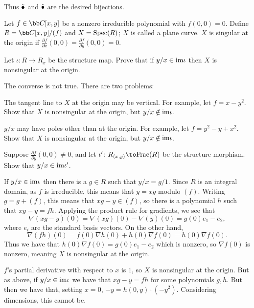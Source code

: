     Thus $\tilde{\bullet}$ and $\hat{\bullet}$ are the desired bijections.
\eenum

\def\pdvof#1#2{\frac{\partial#1}{\partial#2}}

\bprob

    Let $f\in\bC[x,y]$ be a nonzero irreducible polynomial with $f(0,0)=0$.
    Define $R=\bC[x,y]/(f)$ and $X={\rm Spec}(R)$; $X$ is called a {\emphcolor plane curve}.
    $X$ is {\emphcolor singular at the origin} if $\pdvof fx(0,0)=\pdvof fy(0,0)=0$.
    \benum
        \item Let $\iota\colon R\to R_x$ be the structure map.
        Prove that if $y/x\in{\rm im}\iota$ then $X$ is nonsingular at the origin.
        \item The converse is not true.
        There are two problems:
        \benum
            \item The tangent line to $X$ at the origin may be vertical.
            For example, let $f=x-y^2$.
            Show that $X$ is nonsingular at the origin, but $y/x\notin{\rm im}\iota$.
            \item $y/x$ may have poles other than at the origin.
            For example, let $f=y^2-y+x^2$.
            Show that $X$ is nonsingular at the origin, but $y/x\notin{\rm im}\iota$.
        \eenum
        \item Suppose $\pdvof fy(0,0)\neq0$, and let $\iota'\colon R_{(x,y)}\to\Frac(R)$ be the structure morphism.
        Show that $y/x\in{\rm im}\iota'$.
    \eenum

\eprob

\benum
    \item If $y/x\in{\rm im}\iota$ then there is a $g\in R$ such that $y/x=g/1$.
    Since $R$ is an integral domain, as $f$ is irreducible, this means that $y=xg$ modulo $(f)$.
    Writing $g=g+(f)$, this means that $xg-y\in(f)$, so there is a polynomial $h$ such that $xg-y=fh$.
    Applying the product rule for gradients, we see that
    $$ \nabla(xg-y)(0) = \nabla(xg)(0) - \nabla(y)(0) = g(0)e_1 - e_2 , $$
    where $e_i$ are the standard basis vectors.
    On the other hand,
    $$ \nabla(fh)(0) = f(0)\nabla h(0) + h(0)\nabla f(0) = h(0)\nabla f(0) . $$
    Thus we have that $h(0)\nabla f(0)=g(0)e_1-e_2$ which is nonzero, so $\nabla f(0)$ is nonzero, meaning $X$ is nonsingular at the origin.

    \item
    \benum
        \item $f$'s partial derivative with respect to $x$ is $1$, so $X$ is nonsingular at the origin.
        But as above, if $y/x\in{\rm im}\iota$ we have that $xg-y=fh$ for some polynomials $g,h$.
        But then we have that, setting $x=0$, $-y=h(0,y)\cdot(-y^2)$.
        Considering dimensions, this cannot be.

